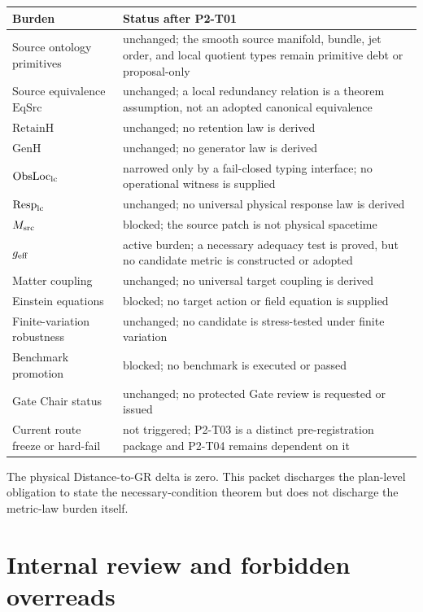 \documentclass[11pt]{article}
\begin{document}
\begin{longtable}{p{}p{}}
\toprule
Burden & Status after P2-T01\\
\midrule
Source ontology primitives & unchanged; the smooth source manifold, bundle,
jet order, and local quotient types remain primitive debt or proposal-only\\
Source equivalence \(\mathrm{EqSrc}\) & unchanged; a local redundancy relation
is a theorem assumption, not an adopted canonical equivalence\\
\(\mathrm{RetainH}\) & unchanged; no retention law is derived\\
\(\mathrm{GenH}\) & unchanged; no generator law is derived\\
\(\mathrm{ObsLoc}_{\rm lc}\) & narrowed only by a fail-closed typing interface;
no operational witness is supplied\\
\(\mathrm{Resp}_{\rm lc}\) & unchanged; no universal physical response law is
derived\\
\(M_{\rm src}\) & blocked; the source patch is not physical spacetime\\
\(g_{\rm eff}\) & active burden; a necessary adequacy test is proved, but no
candidate metric is constructed or adopted\\
Matter coupling & unchanged; no universal target coupling is derived\\
Einstein equations & blocked; no target action or field equation is supplied\\
Finite-variation robustness & unchanged; no candidate is stress-tested under
finite variation\\
Benchmark promotion & blocked; no benchmark is executed or passed\\
Gate Chair status & unchanged; no protected Gate review is requested or issued\\
Current route freeze or hard-fail & not triggered; P2-T03 is a distinct
pre-registration package and P2-T04 remains dependent on it\\
\bottomrule
\end{longtable}

The physical Distance-to-GR delta is zero.  This packet discharges the
plan-level obligation to state the necessary-condition theorem but does not
discharge the metric-law burden itself.

\section{Internal review and forbidden overreads}
\end{document}
